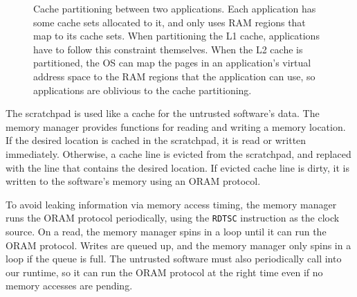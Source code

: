 \begin{figure}[hbtp]
  \caption{
    Cache partitioning between two applications. Each application has some
    cache sets allocated to it, and only uses RAM regions that map to its cache
    sets. When partitioning the L1 cache, applications have to follow this
    constraint themselves. When the L2 cache is partitioned, the OS can map the
    pages in an application's virtual address space to the RAM regions that the
    application can use, so applications are oblivious to the cache
    partitioning.
  }
  \label{fig:cache_partitions}
\end{figure}

The scratchpad is used like a cache for the untrusted software's data. The
memory manager provides functions for reading and writing a memory location.
If the desired location is cached in the scratchpad, it is read or written
immediately. Otherwise, a cache line is evicted from the scratchpad, and
replaced with the line that contains the desired location. If evicted cache
line is dirty, it is written to the software's memory using an ORAM protocol.

To avoid leaking information via memory access timing, the memory manager
runs the ORAM protocol periodically, using the \texttt{RDTSC} instruction as
the clock source. On a read, the memory manager spins in a loop until it can
run the ORAM protocol. Writes are queued up, and the memory manager only spins
in a loop if the queue is full. The untrusted software must also periodically
call into our runtime, so it can run the ORAM protocol at the right time
even if no memory accesses are pending.

